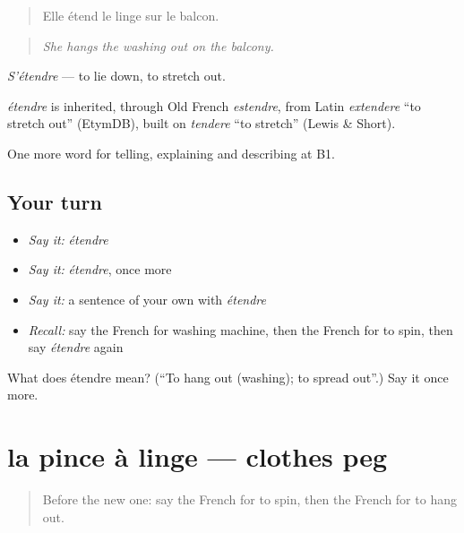 \begin{quote}
Elle étend le linge sur le balcon.
\end{quote}

\begin{quote}
\emph{She hangs the washing out on the balcony.}
\end{quote}

\emph{S'étendre} — to lie down, to stretch out.

\begin{cousinweb}
\emph{étendre} is inherited, through Old French \emph{estendre}, from Latin \emph{extendere} \textquotedblleft{}to stretch out\textquotedblright{} (EtymDB), built on \emph{tendere} \textquotedblleft{}to stretch\textquotedblright{} (Lewis \& Short).
\end{cousinweb}

\begin{grammarlens}[title={What you've built}]
One more word for telling, explaining and describing at B1.
\end{grammarlens}

\subsection*{Your turn}
\begin{itemize}
\raggedright
  \item \emph{Say it:} \emph{étendre}
  \item \emph{Say it:} \emph{étendre}, once more
  \item \emph{Say it:} a sentence of your own with \emph{étendre}
  \item \emph{Recall:} say the French for washing machine, then the French for to spin, then say \emph{étendre} again
\end{itemize}

\begin{tcolorbox}[breakable,colback=teal!4,colframe=teal!35!black,title={Before you move on}]
What does étendre mean? (\textquotedblleft{}To hang out (washing); to spread out\textquotedblright{}.) Say it once more.
\end{tcolorbox}
\section[la pince à linge]{la pince à linge — clothes peg}

\label{lesson:FR-C526-pince-a-linge}



\begin{quote}
Before the new one: say the French for to spin, then the French for to hang out.
\end{quote}

